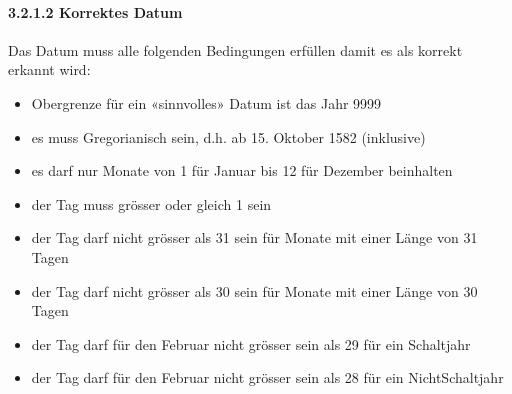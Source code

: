 \documentclass[a4paper,10pt,english]{report}
\begin{document}
\paragraph{3.2.1.2 Korrektes Datum}
\label{\detokenize{P02_Funktionen_Datentyp_enum/README:korrektes-datum}}
\sphinxAtStartPar
Das Datum muss alle folgenden Bedingungen erfüllen damit es als korrekt erkannt wird:
\begin{itemize}
\item {} 
\sphinxAtStartPar
Obergrenze für ein «sinnvolles» Datum ist das Jahr 9999

\item {} 
\sphinxAtStartPar
es muss Gregorianisch sein, d.h. ab 15. Oktober 1582 (inklusive)

\item {} 
\sphinxAtStartPar
es darf nur Monate von 1 für Januar bis 12 für Dezember beinhalten

\item {} 
\sphinxAtStartPar
der Tag muss grösser oder gleich 1 sein

\item {} 
\sphinxAtStartPar
der Tag darf nicht grösser als 31 sein für Monate mit einer Länge von 31 Tagen

\item {} 
\sphinxAtStartPar
der Tag darf nicht grösser als 30 sein für Monate mit einer Länge von 30 Tagen

\item {} 
\sphinxAtStartPar
der Tag darf für den Februar nicht grösser sein als 29 für ein Schaltjahr

\item {} 
\sphinxAtStartPar
der Tag darf für den Februar nicht grösser sein als 28 für ein Nicht\sphinxhyphen{}Schaltjahr

\end{itemize}
\end{document}

